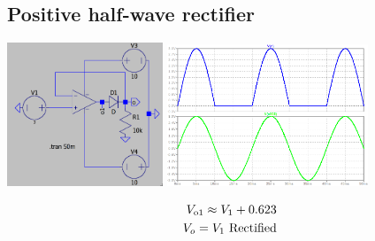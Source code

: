 \documentclass[a4paper, 12pt]{report}
\begin{document}
\begin{center}
\begin{center}
\begin{center}
\begin{center}
\begin{center}
\begin{center}
\begin{center}
\begin{center}
\begin{center}
\begin{center}
\begin{center}
\begin{center}
\section{Positive half-wave rectifier}
\begin{center}
    \includegraphics[width=0.35\textwidth]{figures/211c.png}\quad\quad
    \includegraphics[width=0.45\textwidth]{figures/211w.png}\\
\end{center}
\begin{equation}
\notag
    \begin{align}
        V_\text{o1} \approx V_1 + 0.623\\
        V_o = V_1 \text{\ Rectified}
    \end{align}
\end{equation}
\pagebreak

\end{center}
\end{center}
\end{center}
\end{center}
\end{center}
\end{center}
\end{center}
\end{center}
\end{center}
\end{center}
\end{center}
\end{center}
\end{document}

